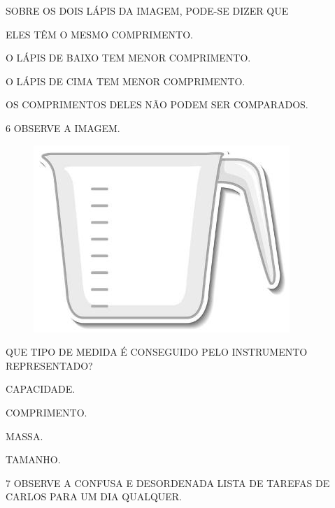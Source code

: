 SOBRE OS DOIS LÁPIS DA IMAGEM, PODE-SE DIZER QUE

\begin{escolha}[itemsep=0pt]
\item ELES TÊM O MESMO COMPRIMENTO.

\item O LÁPIS DE BAIXO TEM MENOR COMPRIMENTO.

\item O LÁPIS DE CIMA TEM MENOR COMPRIMENTO.

\item OS COMPRIMENTOS DELES NÃO PODEM SER COMPARADOS.
\end{escolha}

\num{6} OBSERVE A IMAGEM.


\begin{figure}[H]
\centering
\includegraphics[width=.3\textwidth]{media/image107.jpg}
\end{figure}

QUE TIPO DE MEDIDA É CONSEGUIDO PELO INSTRUMENTO REPRESENTADO?

\begin{escolha}[itemsep=-5pt]
\item CAPACIDADE.

\item COMPRIMENTO.

\item MASSA.

\item TAMANHO.
\end{escolha}

\num{7} OBSERVE A CONFUSA E DESORDENADA LISTA DE TAREFAS DE CARLOS PARA UM DIA
QUALQUER.


